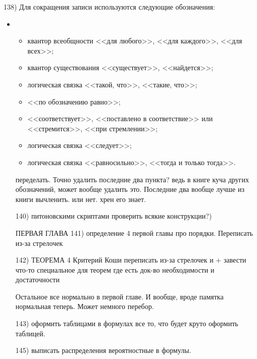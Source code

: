138) Для сокращения записи используются следующие обозначения:
\begin{itemize}
\item[]
\begin{itemize}[noitemsep, label = ---]
\item \makebox[0pt][r]{$\forall$\hspace{0.75cm}}
квантор всеобщности <<для любого>>, <<для каждого>>, <<для всех>>;
\item \makebox[0pt][r]{$\exists$\hspace{0.75cm}}
квантор существования  <<существует>>, <<найдется>>;
\item \makebox[0pt][r]{$:$\hspace{0.75cm}}
логическая связка <<такой, что>>, <<такие, что>>;
\item \makebox[0pt][r]{$\triangleq$\hspace{0.75cm}} 
<<по обозначению равно>>;
\item \makebox[0pt][r]{$\to$\hspace{0.75cm}}
<<соответствует>>, <<поставлено в соответствие>> или <<стремится>>, <<при стремлении>>;
\item \makebox[0pt][r]{$\Rightarrow$\hspace{0.75cm}}
логическая связка <<следует>>;
\item \makebox[0pt][r]{$\Longleftrightarrow$\hspace{0.75cm}}
логическая связка <<равносильно>>, <<тогда и только тогда>>.
\end{itemize}

переделать. Точно удалить последние два пункта? ведь в книге куча других обозначений, может вообще удалить это. Последние два вообще лучше из книги вычленить. или нет. хрен его знает.

140) питоновскими скриптами проверить всякие конструкции?)

ПЕРВАЯ ГЛАВА
141) определение 4 первой главы про порядки. Переписать из-за стрелочек

142) ТЕОРЕМА 4 Критерий Коши переписать из-за стрелочек и + завести что-то специальное для теорем где есть док-во необходимости и достаточности

Остальное все нормально в первой главе. И вообще, вроде памятка нормальная теперь. Может немного перебор.

143) оформить таблицами в формулах все то, что будет круто оформить таблицей.


145) выписать распределения вероятностные в формулы.



\end{itemize}
